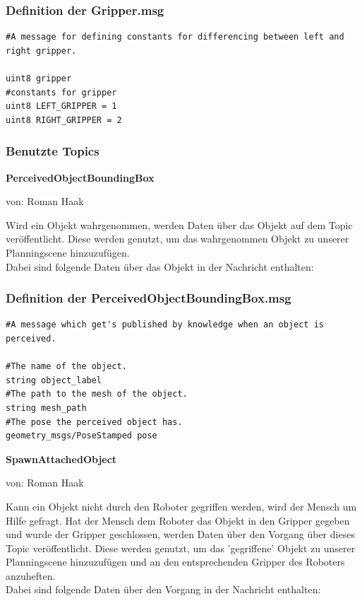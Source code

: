 \documentclass{suturo}
\makeatletter
\newcommand{\chapterauthor}[1]{%
  {\parindent0pt\vspace*{-27pt}%
  \linespread{0}\small\begin{flushright}von: #1\end{flushright}%
  \par\nobreak\vspace*{0pt}}
  \@afterheading%
}
\makeatother
\begin{document}
\subsubsection*{Definition der Gripper.msg}
\begin{verbatim}
#A message for defining constants for differencing between left and right gripper.

uint8 gripper
#constants for gripper
uint8 LEFT_GRIPPER = 1
uint8 RIGHT_GRIPPER = 2
\end{verbatim}

\newpage

\subsubsection{Benutzte Topics}
\textbf{PerceivedObjectBoundingBox}
\chapterauthor{Roman Haak}

Wird ein Objekt wahrgenommen, werden Daten über das Objekt auf dem Topic veröffentlicht. Diese werden genutzt, um das wahrgenommen Objekt zu unserer Planningscene hinzuzufügen.\\ Dabei sind folgende Daten über das Objekt in der Nachricht enthalten: \\

\subsubsection*{Definition der PerceivedObjectBoundingBox.msg}
\begin{verbatim}
#A message which get's published by knowledge when an object is perceived.

#The name of the object.
string object_label
#The path to the mesh of the object.
string mesh_path
#The pose the perceived object has.
geometry_msgs/PoseStamped pose
\end{verbatim}


\textbf{SpawnAttachedObject}
\chapterauthor{Roman Haak}

Kann ein Objekt nicht durch den Roboter gegriffen werden, wird der Mensch um Hilfe gefragt. Hat der Mensch dem Roboter das Objekt in den Gripper gegeben und wurde der Gripper geschlossen, werden Daten über den Vorgang über dieses Topic veröffentlicht. Diese werden genutzt, um das 'gegriffene' Objekt zu unserer Planningscene hinzuzufügen und an den entsprechenden Gripper des Roboters anzuheften.\\ Dabei sind folgende Daten über den Vorgang in der Nachricht enthalten: \\
\end{document}
